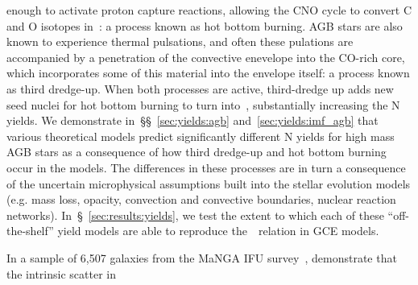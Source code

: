 \documentclass[ms.tex]{subfiles}
\begin{document}
enough to activate proton capture reactions, allowing the CNO cycle to convert
C and O isotopes in~\Nfourteen: a process known as hot bottom burning.
AGB stars are also known to experience thermal pulsations, and often these
pulations are accompanied by a penetration of the convective enevelope into the
CO-rich core, which incorporates some of this material into the envelope
itself: a process known as third dredge-up.
When both processes are active, third-dredge up adds new seed nuclei for hot
bottom burning to turn into~\Nfourteen, substantially increasing the N yields.
We demonstrate in~\S\S~\ref{sec:yields:agb} and~\ref{sec:yields:imf_agb} that
various theoretical models predict significantly different N yields for high
mass AGB stars as a consequence of how third dredge-up and hot bottom burning
occur in the models.
The differences in these processes are in turn a consequence of the uncertain
microphysical assumptions built into the stellar evolution models (e.g. mass
loss, opacity, convection and convective boundaries, nuclear reaction
networks).
In~\S~\ref{sec:results:yields}, we test the extent to which each of these
``off-the-shelf'' yield models are able to reproduce the~\ohno~relation in
GCE models.
\par
In a sample of 6,507 galaxies from the MaNGA IFU survey~\citep{Bundy2015},
\citet{Schaefer2020} demonstrate that the intrinsic scatter in
\end{document}
